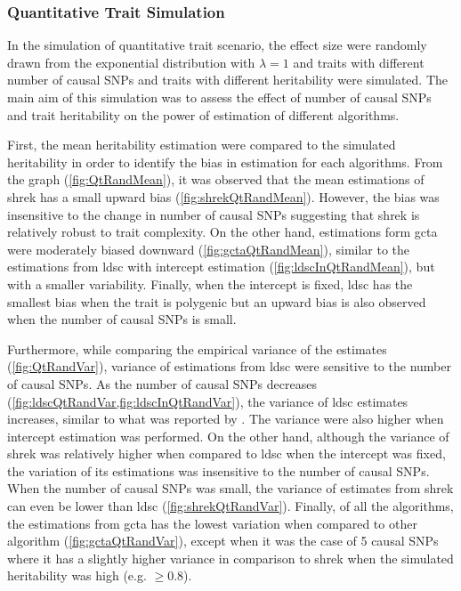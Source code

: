 		\subsubsection{Quantitative Trait Simulation}
		 
		In the simulation of quantitative trait scenario, the effect size were randomly drawn from the exponential distribution with $\lambda=1$ and traits with different number of causal \glspl{SNP} and traits with different heritability were simulated.
		The main aim of this simulation was to assess the effect of number of causal \glspl{SNP} and trait heritability on the power of estimation of different algorithms.
		
		First, the mean heritability estimation were compared to the simulated heritability in order to identify the bias in estimation for each algorithms.
		From the graph (\cref{fig:QtRandMean}), it was observed that the mean estimations of \gls{shrek} has a small upward bias (\cref{fig:shrekQtRandMean}).
		However, the bias was insensitive to the change in number of causal \glspl{SNP} suggesting that \gls{shrek} is relatively robust to trait complexity.
		On the other hand, estimations form \gls{gcta} were moderately biased downward (\cref{fig:gctaQtRandMean}), similar to the estimations from \gls{ldsc} with intercept estimation (\cref{fig:ldscInQtRandMean}), but with a smaller variability.
		Finally, when the intercept is fixed, \gls{ldsc} has the smallest bias when the trait is polygenic but an upward bias is also observed when the number of causal \glspl{SNP} is small.
		
		
		Furthermore, while comparing the empirical variance of the estimates (\cref{fig:QtRandVar}), variance of estimations from \gls{ldsc} were sensitive to the number of causal \glspl{SNP}.
		As the number of causal \glspl{SNP} decreases (\cref{fig:ldscQtRandVar,fig:ldscInQtRandVar}), the variance of \gls{ldsc} estimates increases, similar to what was reported by \citet{Bulik-Sullivan2015}.
		The variance were also higher when intercept estimation was performed. 
		On the other hand, although the variance of \gls{shrek} was relatively higher when compared to \gls{ldsc} when the intercept was fixed, the variation of its estimations was insensitive to the number of causal \glspl{SNP}.
		When the number of causal \glspl{SNP} was small, the variance of estimates from \gls{shrek} can even be lower than \gls{ldsc} (\cref{fig:shrekQtRandVar}).
		Finally, of all the algorithms, the estimations from \gls{gcta} has the lowest variation when compared to other algorithm (\cref{fig:gctaQtRandVar}), except when it was the case of 5 causal \glspl{SNP} where it has a slightly higher variance in comparison to \gls{shrek} when the simulated heritability was high (e.g. $\ge 0.8$).
		


